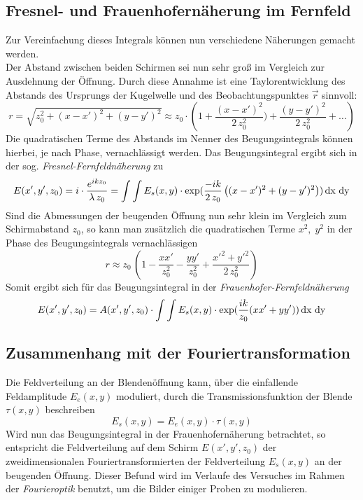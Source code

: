         \subsection*{Fresnel- und Frauenhofernäherung im Fernfeld}
Zur Vereinfachung dieses Integrals können nun verschiedene Näherungen gemacht werden. \\
Der Abstand zwischen beiden Schirmen sei nun sehr groß im Vergleich 
zur Ausdehnung der Öffnung. Durch diese Annahme ist eine Taylorentwicklung des Abstands
des Ursprungs der Kugelwelle und des Beobachtungspunktes $\vec{r}$ sinnvoll:
\[
    r = \sqrt{z_0^2 + (x-x')^2 + (y-y')^2} \approx z_0 \cdot \left( 1 + 
    \frac{(x-x')^2}{2\,z_0^2}) + \frac{(y-y')^2}{2 \, z_0^2} + \dots \right)
\]
Die quadratischen Terme des Abstands im Nenner des Beugungsintegrals können
hierbei, je nach Phase, vernachlässigt werden. Das Beugungsintegral ergibt sich
in der sog. \emph{Fresnel-Fernfeldnäherung} zu
\[
    E(x',y',z_0) = i \cdot \frac{e^{ikz_0}}{\lambda \, z_0} 
    = \int \int E_s(x,y) \cdot \exp(
        \frac{-ik}{2\,z_0} \left((x-x')^2 + (y-y')^2\right)
    ) \,\text{dx}\, \, \text{dy}
\]
Sind die Abmessungen der beugenden Öffnung nun sehr klein im Vergleich zum 
Schirmabstand $z_0$, so kann man zusätzlich die quadratischen Terme $x^2, \; y^2$ 
in der Phase des Beugungsintegrals vernachlässigen
\[
    r \approx z_0 \, \left( 1 - \frac{xx'}{z_0^2} - \frac{yy'}{z_0^2} 
        + \frac{x'^2+y'^2}{2\,z_0^2}
        \right)
\]
Somit ergibt sich für das Beugungsintegral in der \emph{Frauenhofer-Fernfeldnäherung}
\[
    E(x',y',z_0) = A(x',y',z_0) \cdot \int \int E_s(x,y) \cdot
    \exp(\frac{ik}{z_0}(xx'+yy')) \,\text{dx}\, \, \text{dy}
\]

    \subsection*{Zusammenhang mit der Fouriertransformation}
Die Feldverteilung an der Blendenöffnung kann, über die einfallende Feldamplitude 
$E_e(x,y)$ moduliert, durch die Transmissionsfunktion der Blende $\tau(x,y)$ beschreiben 
\[
    E_s(x,y) = E_e(x,y) \cdot \tau(x,y)
\]
Wird nun das Beugungsintegral in der Frauenhofernäherung betrachtet, so 
entspricht die Feldverteilung auf dem Schirm $E(x',y',z_0)$ der zweidimensionalen 
Fouriertransformierten der Feldverteilung $E_s(x,y)$ an der beugenden Öffnung.
Dieser Befund wird im Verlaufe des Versuches im Rahmen der \emph{Fourieroptik}
benutzt, um die Bilder einiger Proben zu modulieren.


